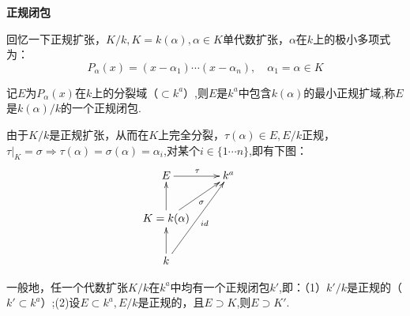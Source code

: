 \documentclass[UTF8]{article}
\begin{document}
\textbf{正规闭包}

回忆一下正规扩张，$K/k,K=k(\alpha),\alpha\in K $单代数扩张，$\alpha$在$k$上的极小多项式为：$$P_{\alpha}(x)=(x-\alpha_1)\cdots(x-\alpha_n),\quad \alpha_1=\alpha\in K$$

记$E$为$P_{\alpha}(x)$在$k$上的分裂域（$\subset k^a$）,则$E$是$k^a$中包含$k(\alpha)$的最小正规扩域,称$E$是$k(\alpha)/k$的一个正规闭包.

由于$K/k$是正规扩张，从而在$K$上完全分裂，$\tau(\alpha)\in E,E/k$正规，$\tau|_K=\sigma \Rightarrow \tau(\alpha)=\sigma(\alpha)=\alpha_i$,对某个$i\in \{1\cdots n\}$,即有下图：
$$\xymatrix{E\ar[r]^{\tau}&{k^a}\\K=k(\alpha)\ar[u]\ar[ru]_{\sigma}\\k\ar[u]\ar[ruu]_{id}&&}$$

一般地，任一个代数扩张$K/k$在$k^a$中均有一个正规闭包$k'$,即：（1）$k'/k$是正规的（$k'\subset k^a$）;(2)设$E\subset k^a,E/k$是正规的，且$E\supset K$,则$E\supset K'$.
\end{document}
